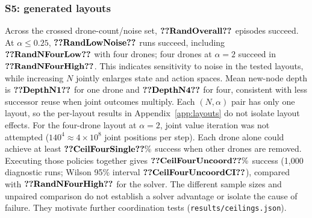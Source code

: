 \subsubsection*{S5: generated layouts}
Across the crossed drone-count/noise set, $\val{RandOverall}$ episodes
succeed. At $\alpha\le0.25$, $\val{RandLowNoise}$ runs succeed,
including $\val{RandNFourLow}$ with four drones; four drones at $\alpha=2$
succeed in $\val{RandNFourHigh}$. This indicates sensitivity to noise in
the tested layouts, while increasing $N$ jointly enlarges state and action
spaces. Mean new-node depth is $\val{DepthN1}$ for one drone and
$\val{DepthN4}$ for four, consistent with less successor reuse when joint
outcomes multiply. Each $(N,\alpha)$ pair has only one layout, so the
per-layout results in Appendix~\ref{app:layouts} do not isolate layout effects.
For the four-drone layout at $\alpha=2$, joint value iteration was not attempted
($140^4\approx4\times10^8$ joint positions per step). Each drone alone could
achieve at least $\val{CeilFourSingle}\%$ success when other drones are removed.
Executing those policies together gives $\val{CeilFourUncoord}\%$ success
(1,000 diagnostic runs; Wilson 95\% interval $\val{CeilFourUncoordCI}$),
compared with $\val{RandNFourHigh}$ for the solver. The different sample sizes
and unpaired comparison do not establish a solver advantage or isolate the
cause of failure. They motivate further coordination tests
(\texttt{results/ceilings.json}).

